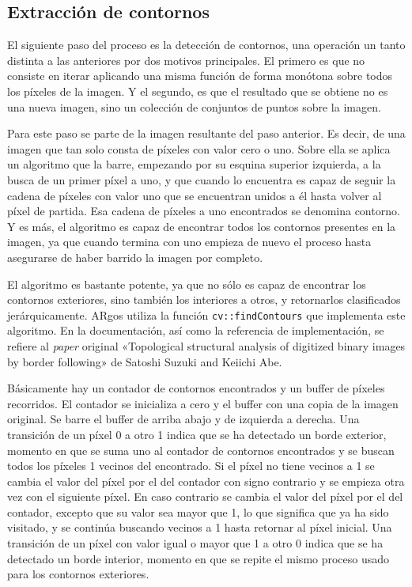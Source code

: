 \subsection{Extracción de contornos}
El siguiente paso del proceso es la detección de contornos, una operación un tanto distinta a las
anteriores por dos motivos principales. El primero es que no consiste en iterar aplicando una misma
función de forma monótona sobre todos los píxeles de la imagen. Y el segundo, es que el resultado que
se obtiene no es una nueva imagen, sino un colección de conjuntos de puntos sobre la imagen.

Para este paso se parte de la imagen resultante del paso anterior. Es decir, de una imagen que tan
solo consta de píxeles con valor cero o uno. Sobre ella se aplica un algoritmo que la barre,
empezando por su esquina superior izquierda, a la busca de un primer píxel a uno, y que cuando lo
encuentra es capaz de seguir la cadena de píxeles con valor uno que se encuentran unidos a él hasta
volver al píxel de partida. Esa cadena de píxeles a uno encontrados se denomina contorno. Y es más,
el algoritmo es capaz de encontrar todos los contornos presentes en la imagen, ya que cuando termina
con uno empieza de nuevo el proceso hasta asegurarse de haber barrido la imagen por completo.

El algoritmo es bastante potente, ya que no sólo es capaz de encontrar los contornos exteriores,
sino también los interiores a otros, y retornarlos clasificados jerárquicamente. ARgos utiliza la
función \texttt{cv::findContours} que implementa este algoritmo. En la documentación, así como la
referencia de implementación, se refiere al \textit{paper} original «Topological structural analysis
of digitized binary images by border following» de Satoshi Suzuki and Keiichi Abe.

Básicamente hay un contador de contornos encontrados y un buffer de píxeles recorridos. El contador
se inicializa a cero y el buffer con una copia de la imagen original. Se barre el buffer de arriba
abajo y de izquierda a derecha. Una transición de un píxel 0 a otro 1 indica que se ha detectado un
borde exterior, momento en que se suma uno al contador de contornos encontrados y se buscan todos
los píxeles 1 vecinos del encontrado. Si el píxel no tiene vecinos a 1 se cambia el valor del píxel
por el del contador con signo contrario y se empieza otra vez con el siguiente píxel. En caso
contrario se cambia el valor del píxel por el del contador, excepto que su valor sea mayor que 1, lo
que significa que ya ha sido visitado, y se continúa buscando vecinos a 1 hasta retornar al píxel
inicial. Una transición de un píxel con valor igual o mayor que 1 a otro 0 indica que se ha
detectado un borde interior, momento en que se repite el mismo proceso usado para los contornos
exteriores.

